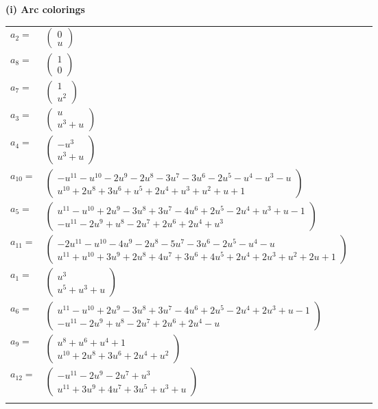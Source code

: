 \documentclass[1p]{elsarticle_modified}
\theoremstyle{definition}
\begin{document}
\flushleft \textbf{(i) Arc colorings}\\
\begin{tabular}{m{7pt} m{180pt} m{7pt} m{180pt} }
\flushright $a_{2}=$&$\begin{pmatrix}0\\u\end{pmatrix}$ \\
\flushright $a_{8}=$&$\begin{pmatrix}1\\0\end{pmatrix}$ \\
\flushright $a_{7}=$&$\begin{pmatrix}1\\u^2\end{pmatrix}$ \\
\flushright $a_{3}=$&$\begin{pmatrix}u\\u^3+u\end{pmatrix}$ \\
\flushright $a_{4}=$&$\begin{pmatrix}- u^3\\u^3+u\end{pmatrix}$ \\
\flushright $a_{10}=$&$\begin{pmatrix}- u^{11}- u^{10}-2 u^9-2 u^8-3 u^7-3 u^6-2 u^5- u^4- u^3- u\\u^{10}+2 u^8+3 u^6+u^5+2 u^4+u^3+u^2+u+1\end{pmatrix}$ \\
\flushright $a_{5}=$&$\begin{pmatrix}u^{11}- u^{10}+2 u^9-3 u^8+3 u^7-4 u^6+2 u^5-2 u^4+u^3+u-1\\- u^{11}-2 u^9+u^8-2 u^7+2 u^6+2 u^4+u^3\end{pmatrix}$ \\
\flushright $a_{11}=$&$\begin{pmatrix}-2 u^{11}- u^{10}-4 u^9-2 u^8-5 u^7-3 u^6-2 u^5- u^4- u\\u^{11}+u^{10}+3 u^9+2 u^8+4 u^7+3 u^6+4 u^5+2 u^4+2 u^3+u^2+2 u+1\end{pmatrix}$ \\
\flushright $a_{1}=$&$\begin{pmatrix}u^3\\u^5+u^3+u\end{pmatrix}$ \\
\flushright $a_{6}=$&$\begin{pmatrix}u^{11}- u^{10}+2 u^9-3 u^8+3 u^7-4 u^6+2 u^5-2 u^4+2 u^3+u-1\\- u^{11}-2 u^9+u^8-2 u^7+2 u^6+2 u^4- u\end{pmatrix}$ \\
\flushright $a_{9}=$&$\begin{pmatrix}u^8+u^6+u^4+1\\u^{10}+2 u^8+3 u^6+2 u^4+u^2\end{pmatrix}$ \\
\flushright $a_{12}=$&$\begin{pmatrix}- u^{11}-2 u^9-2 u^7+u^3\\u^{11}+3 u^9+4 u^7+3 u^5+u^3+u\end{pmatrix}$\\&\end{tabular}
\end{document}
